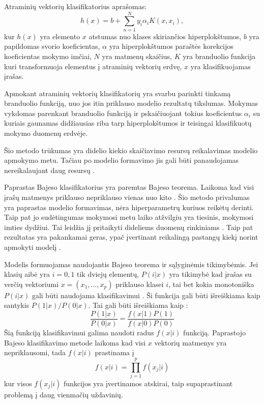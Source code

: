 Atraminių vektorių klasifikatorius aprašomas\cite{comp}:
\begin{equation}
    h(x) = b + \sum_{n=1}^{N}y_i \alpha_i K(x, x_i),
\end{equation}
kur $h(x)$ yra elemento $x$ atstumas nuo klases skiriančios hiperplokštumos, $b$ yra papildomas svorio koeficientas, $\alpha$ yra hiperplokštumos paraštės korekcijos koeficientas mokymo imčiai, $N$ yra matmenų skaičius, $K$ yra branduolio funkcija kuri transformuoja elementus į atraminių vektorių erdvę, $x$ yra klasifikuojamas įrašas.

Apmokant atraminių vektorių klasifikatorių yra svarbu parinkti tinkamą branduolio funkciją, nuo jos itin priklauso modelio rezultatų tikslumas. Mokymas vykdomas parenkant branduolio funkciją ir pskaičiuojant tokius koeficientus $\alpha_i$ su kuriais gaunamas didžiausias riba tarp hiperplokštumos ir teisingai klasifikuotų mokymo duomenų erdvėje.

Šio metodo trūkumas yra didelio kiekio skaičiavimo resursų reikalavimas modelio apmokymo metu. Tačiau po modelio formavimo jis gali būti panaudojamas nereikalaujant daug resursų \cite{Wu2008}.

Paprastas Bajeso klasifikatorius yra paremtas Bajeso teorema. Laikoma kad visi įrašų matmenys priklauso nepriklauso vienas nuo kito \cite{comp}. Šio metodo privalumas yra paprastas modelio formavimas, nėra hiperparametrų kuriuos reikėtų derinti. Taip pat jo sudėtingumas mokymosi metu laiko atžvilgiu yra tiesinis, mokymosi imties dydžiui. Tai leidžia jį pritaikyti dideliems duomenų rinkiniams \cite{Wu2008}. Taip pat rezultatas yra pakankamai geras, ypač įvertinant reikalingą pastangų kiekį norint apmokyti modelį \cite{Wu2008}.

  Modelis formuojamas naudojantis Bajeso teorema ir sąlyginėmis tikimybėmis. Jei klasių aibė yra $i = 0, 1$ tik dviejų elementų, $P(i|x)$ yra tikimybė kad įrašas su verčių vektoriumi $x = (x_1, ..., x_p)$ priklauso klasei $i$, tai bet kokia monotoniška $P(i|x)$ gali būti naudojama klasifikavimui \cite{Wu2008}. Ši funkcija gali būti išreiškiama kaip santykis $P(1|x)/P(0|x)$. Tai gali būti išreiškiama kaip \cite{wu2008}:
    \begin{equation}
        \frac{P(1|x)}{P(0|x)} = \frac{f(x|1)P(1)}{f(x|0)P(0)}
    \end{equation}
  Šią funkciją klasifikavimui galima naudoti radus $f(x|i)$ funkciją. Paprastojo Bajeso klasifikavimo metode laikoma kad visi $x$ vektorių matmenys yra nepriklausomi, tada $f(x|i)$ prastinama į \cite{Wu2008}
  \begin{equation}
    f(x|i) = \prod_{j=1}^{p} f(x_j|i)
  \end{equation}
  kur visos $f(x_j|i)$ funkcijos yra įvertinamos atskirai, taip supaprastinant problemą į daug  vienmačių uždavinių.

